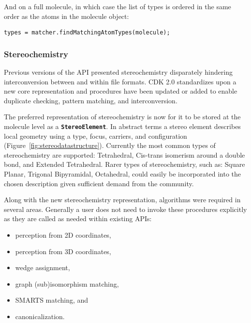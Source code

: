 \documentclass[10pt]{bmcart}
\def \cdkversion {2.0}
\begin{document}
And on a full molecule, in which case the list of types is ordered in the same
order as the atoms in the molecule object:

\vspace{0.2cm}
\begin{verbatim}
types = matcher.findMatchingAtomTypes(molecule);
\end{verbatim}
\vspace{0.2cm}

  \subsubsection*{Stereochemistry}

  Previous versions of the API presented stereochemistry disparately hindering 
  interconversion between and within file formats. CDK \cdkversion{} standardizes
  upon a new core representation and procedures have been updated or added to
  enable duplicate checking, pattern matching, and interconversion.

  The preferred representation of stereochemistry is now for it to be stored at the molecule
  level as a \texttt{\textbf{StereoElement}}. In abstract terms a stereo element describes local
  geometry using a type, focus, carriers, and configuration (Figure~\ref{fig:stereodatastructure}).
  Currently the most common types of stereochemistry are supported: Tetrahedral, Cis-trans isomerism 
  around a double bond, and Extended Tetrahedral. Rarer types of stereochemistry, such as: Square 
  Planar, Trigonal Bipyramidal, Octahedral, could easily be incorporated into the chosen description 
   given sufficient demand from the community.


  Along with the new stereochemistry representation, algorithms were required in several areas. Generally
  a user does not need to invoke these procedures explicitly as they are called as needed within existing
  APIs:

\vspace{0.2cm}
  \begin{itemize}
   \item perception from 2D coordinates,
   \item perception from 3D coordinates,
   \item wedge assignment,
   \item graph (sub)isomorphism matching,
   \item SMARTS matching, and
   \item canonicalization.
  \end{itemize}
\vspace{0.2cm}
\end{document}
